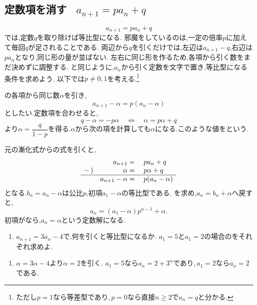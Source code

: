 
\subsection{\texorpdfstring{定数項を消す \, $a_{n+1}=pa_n+q$}{定数項を消す}}\label{節：特性方程式型}
  \[
    a_{n+1}=pa_n+q
  \]
  では,定数$q$を取り除けば等比型になる.
  邪魔をしているのは,一定の倍率$p$に加えて毎回$q$が足されることである.
  両辺から$q$を引くだけでは,左辺は$a_{n+1}-q$,右辺は$pa_n$となり,同じ形の量が並ばない.
  左右に同じ形を作るため,各項から引く数をまだ決めずに調整する.
  と同じように,$a_n$から引く定数を文字で置き,等比型になる条件を求めよう.
  以下では$p\ne0,1$を考える.\footnote{ただし$p=1$なら等差型であり,\,$p=0$なら直接$n\ge2$で$a_n=q$と分かる.}

  の各項から同じ数$\alpha$を引き,
  \[
    a_{n+1}-\alpha=p(a_n-\alpha)
  \]
  としたい.定数項を合わせると,
  \[
    q-\alpha=-p\alpha
    \quad\Longleftrightarrow\quad
    \alpha=p\alpha+q
  \]
  より$\alpha=\dfrac{q}{1-p}$を得る.$\alpha$から次の項を計算しても$\alpha$になる.このような値をという.

  元の漸化式からの式を引くと,
  \[
    \begin{array}{rrl}
       &a_{n+1}={}&pa_n+q\\
      -\,)&\alpha={}&p\alpha+q\\ \hline
       &a_{n+1}-\alpha={}&p(a_n-\alpha)
    \end{array}
  \]
  となる.$b_n=a_n-\alpha$は公比$p$,初項$a_1-\alpha$の等比型である.
  を求め,$a_n=b_n+\alpha$へ戻すと,
  \[
    a_n=(a_1-\alpha)p^{n-1}+\alpha.
  \]
  初項がなら,$a_n=\alpha$という定数解になる.

  \noindent{}\par\nobreak
  \begin{enumerate}[format=\bookitemlink{check-fixed}{problem}{answer}]
    \item $a_{n+1}=3a_n-4$で,何を引くと等比型になるか.
          $a_1=5$と$a_1=2$の場合のをそれぞれ求めよ.
  \end{enumerate}
  \noindent{}\par\nobreak
  \begin{enumerate}[format=\bookitemlink{check-fixed}{answer}{problem}]
    \item $\alpha=3\alpha-4$より$\alpha=2$を引く.
          $a_1=5$なら$a_n=2+3^n$であり,\,$a_1=2$なら$a_n=2$である.
  \end{enumerate}

